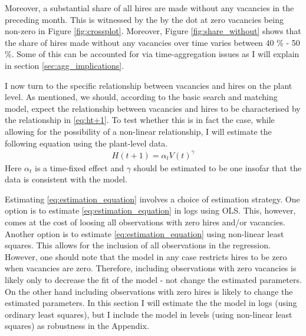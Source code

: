 Moreover, a substantial share of all hires are made without any vacancies in the preceding month. This is witnessed by the by the dot at zero vacancies being non-zero in Figure \ref{fig:crossplot}. Moreover, Figure \ref{fig:share_without} shows that the share of hires made without any vacancies over time varies between 40 \% - 50 \%. Some of this can be accounted for via time-aggregation issues as I will explain in section \ref{sec:agg_implications}. 




I now turn to the specific relationship between vacancies and hires on the plant level. As mentioned, we should, according to the basic search and matching model, expect the relationship between vacancies and hires to be characterised by the relationship in \eqref{eq:ht+1}. To test whether this is in fact the case, while allowing for the possibility of a non-linear relationship, I will estimate the following equation using the plant-level data.
\begin{align}
H(t+1)=\alpha_t V(t)^{\gamma}
\label{eq:estimation_equation}
\end{align}
Here $\alpha_t$ is a time-fixed effect and $\gamma$ should be estimated to be one insofar that the data is consistent with the model.

Estimating \eqref{eq:estimation_equation} involves a choice of estimation strategy. One option is to estimate \eqref{eq:estimation_equation} in logs using OLS. This, however, comes at the cost of loosing all observations with zero hires and/or vacancies. Another option is to estimate \eqref{eq:estimation_equation} using non-linear least squares. This allows for the inclusion of all observations in the regression. However, one should note that the model in any case restricts hires to be zero when vacancies are zero. Therefore, including observations with zero vacancies is likely only to decrease the fit of the model - not change the estimated parameters. On the other hand including observations with zero hires is likely to change the estimated parameters. In this section I will estimate the the model in logs (using ordinary least squares), but I include the model in levels (using non-linear least squares) as robustness in the Appendix.

